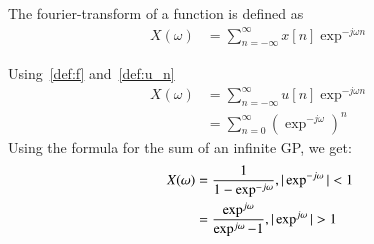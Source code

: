 \documentclass[journal,12pt,twocolumn]{IEEEtran}
\begin{document}
\begin{definition}\label{def:f}
    The fourier-transform of a function is defined as
    \begin{align}
        X(\omega) &=\sum_{n=-\infty}^{\infty} x[n]\exp^{-j\omega n}
    \end{align}
\end{definition}
Using~\eqref{def:f} and~\eqref{def:u_n}
\begin{align}
    X(\omega)&=\sum_{n=-\infty}^{\infty} u[n]\exp^{-j\omega n}\\
    &=\sum_{n=0}^{\infty} ({\exp^{-j\omega}})^n
\end{align}
Using the formula for the sum of an infinite GP, we get:
\begin{align}
    X(\omega)&=\frac{1}{1-\exp^{-j\omega}},\vert\exp^{-j\omega}\vert < 1\\
    &=\frac{\exp^{j\omega}}{\exp^{j\omega}-1},\vert\exp^{j\omega}\vert>1
\end{align}
\end{document}

